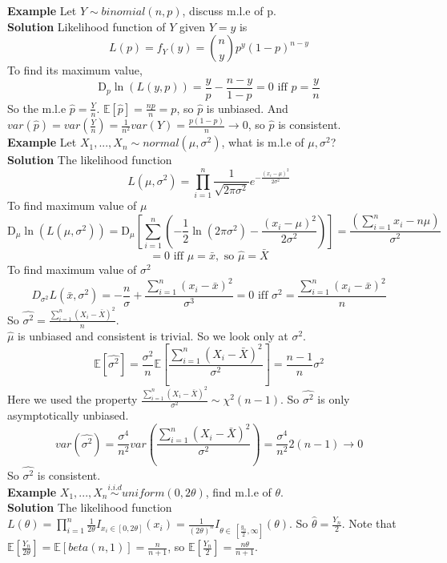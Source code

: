 \documentclass[a4paper,12pt]{article}
\begin{document}
\textbf{Example} Let $Y \sim binomial(n, p)$, discuss m.l.e of p.\\

\textbf{Solution} Likelihood function of $Y$ given $Y=y $ is
$$L(p) = f_Y(y) = {n \choose y}p^y(1-p)^{n-y}$$
To find its maximum value, 
$$\mathrm{D}_p \ln( L(y, p) ) = \frac{y}{p} - \frac{n-y}{1-p} = 0 \text{ iff } p = \frac{y}{n}$$
So the m.l.e $\hat{p} = \frac{Y}{n}$. $\mathbb{E}[\hat{p}] = \frac{np}{n} = p$, so $\hat{p}$ is unbiased. 
And $var(\hat{p}) = var(\frac{Y}{n}) = \frac{1}{n^2}var(Y) = \frac{p(1-p)}{n} \to 0$, so $\hat{p}$ is consistent.\\

\textbf{Example} Let $X_1, ..., X_n \sim normal(\mu, \sigma^2)$, what is m.l.e of $\mu, \sigma^2$?\\

\textbf{Solution} The likelihood function $$L(\mu, \sigma^2) = \prod_{i=1}^n \frac{1}{\sqrt{2\pi \sigma^2}}e^{-\frac{(x_i-\mu)^2}{2\sigma^2}}$$
To find maximum value of $\mu$
$$\mathrm{D}_\mu \ln( L(\mu, \sigma^2) ) =  \mathrm{D}_\mu [\sum_{i=1}^n (-\frac{1}{2}\ln(2\pi\sigma^2) - \frac{(x_i-\mu)^2}{2\sigma^2} )] = \frac{(\sum_{i=1}^n x_i-n\mu)}{\sigma^2}$$
$$= 0 \text{ iff } \mu = \bar{x}, \text{ so } \hat{\mu} = \bar{X}$$
To find maximum value of $\sigma^2$
$$D_{\sigma^2} L(\bar{x}, \sigma^2) = -\frac{n}{\sigma} + \frac{\sum_{i=1}^n(x_i - \bar{x})^2}{\sigma^3} = 0 \text{ iff } \sigma^2 = \frac{\sum_{i=1}^n(x_i - \bar{x})^2}{n}$$
So $\hat{\sigma^2} = \frac{\sum_{i=1}^n(X_i - \bar{X})^2}{n}$.\\

$\hat{\mu}$ is unbiased and consistent is trivial. So we look only at $\sigma^2$.
$$\mathbb{E}[\hat{\sigma^2}] = \frac{\sigma^2}{n}\mathbb{E}[\frac{\sum_{i=1}^n(X_i - \bar{X})^2}{\sigma^2}] = \frac{n-1}{n} \sigma^2$$
Here we used the property $\frac{\sum_{i=1}^n(X_i - \bar{X})^2}{\sigma^2} \sim \chi^2(n-1)$. So $\hat{\sigma^2}$ is only asymptotically unbiased.
$$var(\hat{\sigma^2}) = \frac{\sigma^4}{n^2} var( \frac{\sum_{i=1}^n(X_i - \bar{X})^2}{\sigma^2} ) = \frac{\sigma^4}{n^2}2(n-1) \to 0$$
So $\hat{\sigma^2}$ is consistent.\\

\textbf{Example} $X_1, ..., X_n \overset{i.i.d}{\sim} uniform(0, 2\theta)$, find m.l.e of $\theta$.\\

\textbf{Solution} The likelihood function $L(\theta) = \prod_{i=1}^n \frac{1}{2\theta}I_{x_i\in[0, 2\theta]}(x_i) = \frac{1}{(2\theta)^n}I_{\theta\in\ [\frac{y_n}{2}, \infty]}(\theta)$. So $\hat{\theta} = \frac{Y_n}{2}$. Note that $\mathbb{E}[\frac{Y_n}{2\theta}] = \mathbb{E}[ beta(n, 1) ] = \frac{n}{n+1}$, so $\mathbb{E}[\frac{Y_n}{2}] = \frac{n\theta}{n+1}$.\\
\end{document}
